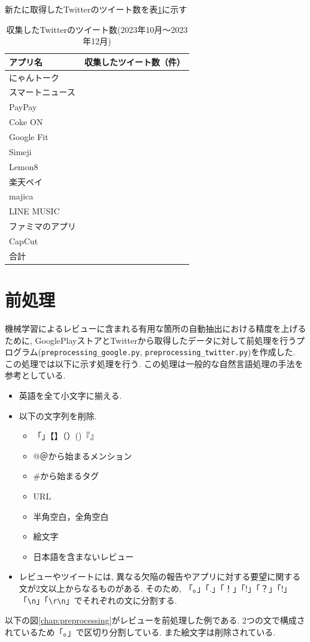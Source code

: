 新たに取得したTwitterのツイート数を表\ref{tb:rawtweetnum2023}に示す

\begin{table}[htbp]
  \caption{収集したTwitterのツイート数(2023年10月〜2023年12月)}
  \label{tb:rawtweetnum2023}
  \begin{center}
  \begin{tabular}{l|l}
    \hline
    アプリ名&収集したツイート数（件）\\\hline\hline
    にゃんトーク&\\\hline
    スマートニュース&\\\hline
    PayPay&\\\hline
    Coke ON&\\\hline
    Google Fit&\\\hline
    Simeji&\\\hline
    Lemon8&\\\hline
    楽天ペイ&\\\hline
    majica&\\\hline
    LINE MUSIC&\\\hline
    ファミマのアプリ&\\\hline
    CapCut&\\\hline\hline
    合計&
  \end{tabular}\end{center}
\end{table}


\section{前処理}
機械学習によるレビューに含まれる有用な箇所の自動抽出における精度を上げるために, GooglePlayストアとTwitterから取得したデータに対して前処理を行うプログラム(\verb|preprocessing_google.py|, \verb|preprocessing_twitter.py|)を作成した. この処理では以下に示す処理を行う. この処理は一般的な自然言語処理の手法を参考としている. 
\begin{itemize}
  \item 英語を全て小文字に揃える. 
  \item 以下の文字列を削除. 
    \begin{itemize}
      \item 「」【】（）()『』
      \item @＠から始まるメンション
      \item \#から始まるタグ
      \item URL
      \item 半角空白，全角空白
      \item 絵文字
      \item 日本語を含まないレビュー
    \end{itemize}
  \item レビューやツイートには, 異なる欠陥の報告やアプリに対する要望に関する文が2文以上からなるものがある. そのため, 「。」「.」「！」「!」「？」「!」「\verb|\n|」「\verb|\r\n|」でそれぞれの文に分割する. 
\end{itemize}
以下の図\ref{chap:preprocessing}がレビューを前処理した例である. 2つの文で構成されているため「。」で区切り分割している. また絵文字は削除されている. 

